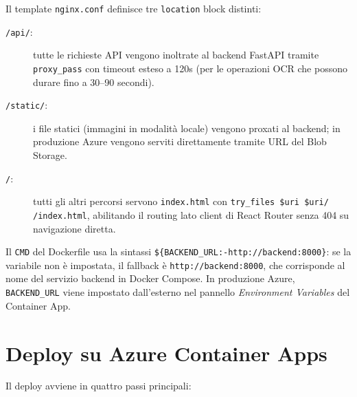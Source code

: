 \documentclass[12pt,a4paper,oneside]{report}
\begin{document}
Il template \texttt{nginx.conf} definisce tre \texttt{location} block distinti:
\begin{description}
    \item[\texttt{/api/}:] tutte le richieste API vengono inoltrate al backend FastAPI
          tramite \texttt{proxy\_pass} con timeout esteso a 120s
          (per le operazioni OCR che possono durare fino a 30--90 secondi).
    \item[\texttt{/static/}:] i file statici (immagini in modalit\`{a} locale)
          vengono proxati al backend; in produzione Azure vengono serviti direttamente
          tramite URL del Blob Storage.
    \item[\texttt{/}:] tutti gli altri percorsi servono \texttt{index.html} con
          \texttt{try\_files \$uri \$uri/ /index.html}, abilitando il routing lato client
          di React Router senza 404 su navigazione diretta.
\end{description}

\begin{notabox}[title={Valore di default per sviluppo locale}]
Il \texttt{CMD} del Dockerfile usa la sintassi \texttt{\$\{BACKEND\_URL:-http://backend:8000\}}:
se la variabile non \`{e} impostata, il fallback \`{e} \texttt{http://backend:8000},
che corrisponde al nome del servizio backend in Docker Compose.
In produzione Azure, \texttt{BACKEND\_URL} viene impostato dall'esterno nel pannello
\textit{Environment Variables} del Container App.
\end{notabox}

\section{Deploy su Azure Container Apps}

Il deploy avviene in quattro passi principali:
\end{document}
